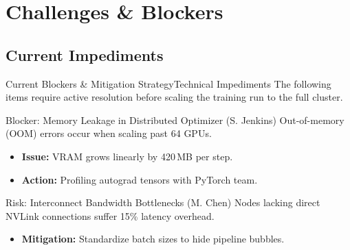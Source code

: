 \section{Challenges \& Blockers}
\subsection{Current Impediments}

\begin{frame}{Current Blockers \& Mitigation Strategy}{Technical Impediments}
  The following items require active resolution before scaling the training run to the full cluster.
  
  \vspace{0.4cm}
  \begin{minipage}{\textwidth}
    \begin{blockerbox}{Blocker: Memory Leakage in Distributed Optimizer (S. Jenkins)}
      Out-of-memory (OOM) errors occur when scaling past 64 GPUs.
      \begin{itemize}
        \item \textbf{Issue:} VRAM grows linearly by 420\,MB per step.
        \item \textbf{Action:} Profiling autograd tensors with PyTorch team.
      \end{itemize}
    \end{blockerbox}
  \end{minipage}
  
  \par\vspace{0.25cm}
  
  \begin{minipage}{\textwidth}
    \begin{warningbox}{Risk: Interconnect Bandwidth Bottlenecks (M. Chen)}
      Nodes lacking direct NVLink connections suffer 15\% latency overhead.
      \begin{itemize}
        \item \textbf{Mitigation:} Standardize batch sizes to hide pipeline bubbles.
      \end{itemize}
    \end{warningbox}
  \end{minipage}
\end{frame}
